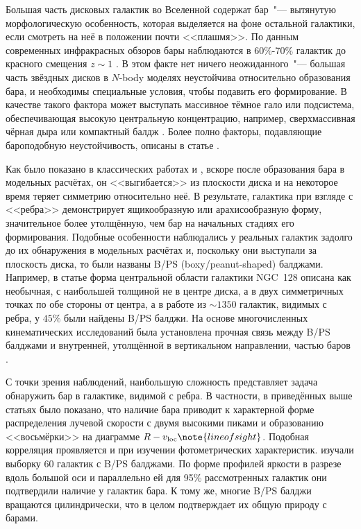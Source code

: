 \documentclass{trlnotes}
\begin{document}
Большая часть дисковых галактик во Вселенной содержат бар~"--- вытянутую морфологическую особенность, которая выделяется на фоне остальной галактики, если смотреть на неё в положении почти <<плашмя>>. По данным современных инфракрасных обзоров бары наблюдаются в 60\%-70\% галактик до красного смещения $z\sim 1$ \citep{marinova2007}.  В этом факте нет ничего неожиданного~"--- большая часть звёздных дисков в $N$-body моделях неустойчива относительно образования бара, и необходимы специальные условия, чтобы подавить его формирование. В качестве такого фактора может выступать массивное тёмное гало или подсистема, обеспечивающая высокую центральную концентрацию, например, сверхмассивная чёрная дыра \citep{shen2004} или компактный балдж \citep{saha2018}. Более полно факторы, подавляющие бароподобную неустойчивость, описаны в статье \citet{sellwood2019}.

Как было показано в классических работах \citet{combes1981a} и \citet{raha1991}, вскоре после образования бара в модельных расчётах, он <<выгибается>> из плоскости диска и на некоторое время теряет симметрию относительно неё. В результате, галактика при взгляде с <<ребра>> демонстрирует ящикообразную или арахисообразную форму, значительное более утолщённую, чем бар на начальных стадиях его формирования. Подобные особенности наблюдались у реальных галактик задолго до их обнаружения в модельных расчётах и, поскольку они выступали за плоскость диска, то были названы B/PS (boxy/peanut-shaped) балджами. Например, в статье \citet{burbidge1959} форма центральной области галактики NGC~128 описана как необычная, с наибольшей толщиной не в центре диска, а в двух симметричных точках по обе стороны от центра, а в работе \citet{lutticke2000} из $\sim\!1350$ галактик, видимых с ребра, у $45\%$ были найдены B/PS балджи.  На основе многочисленных кинематических исследований была установлена прочная связь между B/PS балджами и внутренней, утолщённой в вертикальном направлении, частью баров \citep{kuijken1995,bureau1999,chung2004,bureau2006}. 

С точки зрения наблюдений, наибольшую сложность представляет задача обнаружить бар в галактике, видимой с ребра. В частности, в приведённых выше статьях было показано, что наличие бара приводит к характерной форме распределения лучевой скорости с двумя высокими пиками и образованию <<восьмёрки>> на диаграмме $R - v_{\text{loc}}\note{line of sight}$.  Подобная корреляция проявляется и при изучении фотометрических характеристик. \citet{lutticke2000a} изучали выборку 60 галактик с B/PS балджами. По форме профилей яркости в разрезе вдоль большой оси и параллельно ей для 95\% рассмотренных галактик они  подтвердили наличие у галактик бара.  К тому же, многие B/PS балджи вращаются цилиндрически, что в целом подтверждает их общую природу с барами. 
 
\end{document}
